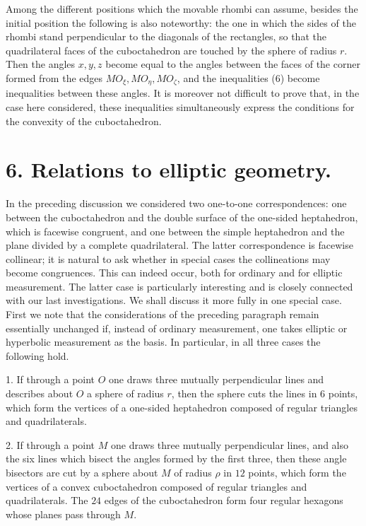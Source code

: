 \documentclass[11pt,a4paper]{article}
\begin{document}
Among the different positions which the movable rhombi can assume, besides the initial position the following is also noteworthy: the one in which the sides of the rhombi stand perpendicular to the diagonals of the rectangles, so that the quadrilateral faces of the cuboctahedron are touched by the sphere of radius $r$. Then the angles $x,y,z$ become equal to the angles between the faces of the corner formed from the edges $MO_\xi,MO_\eta,MO_\zeta$, and the inequalities (6) become inequalities between these angles. It is moreover not difficult to prove that, in the case here considered, these inequalities simultaneously express the conditions for the convexity of the cuboctahedron.

\section*{6. Relations to elliptic geometry.}

In the preceding discussion we considered two one-to-one correspondences: one between the cuboctahedron and the double surface of the one-sided heptahedron, which is facewise congruent, and one between the simple heptahedron and the plane divided by a complete quadrilateral. The latter correspondence is facewise collinear; it is natural to ask whether in special cases the collineations may become congruences. This can indeed occur, both for ordinary and for elliptic measurement. The latter case is particularly interesting and is closely connected with our last investigations. We shall discuss it more fully in one special case. First we note that the considerations of the preceding paragraph remain essentially unchanged if, instead of ordinary measurement, one takes elliptic or hyperbolic measurement as the basis. In particular, in all three cases the following hold.

1. If through a point $O$ one draws three mutually perpendicular lines and describes about $O$ a sphere of radius $r$, then the sphere cuts the lines in $6$ points, which form the vertices of a one-sided heptahedron composed of regular triangles and quadrilaterals.

2. If through a point $M$ one draws three mutually perpendicular lines, and also the six lines which bisect the angles formed by the first three, then these angle bisectors are cut by a sphere about $M$ of radius $\rho$ in $12$ points, which form the vertices of a convex cuboctahedron composed of regular triangles and quadrilaterals. The $24$ edges of the cuboctahedron form four regular hexagons whose planes pass through $M$.
\end{document}
